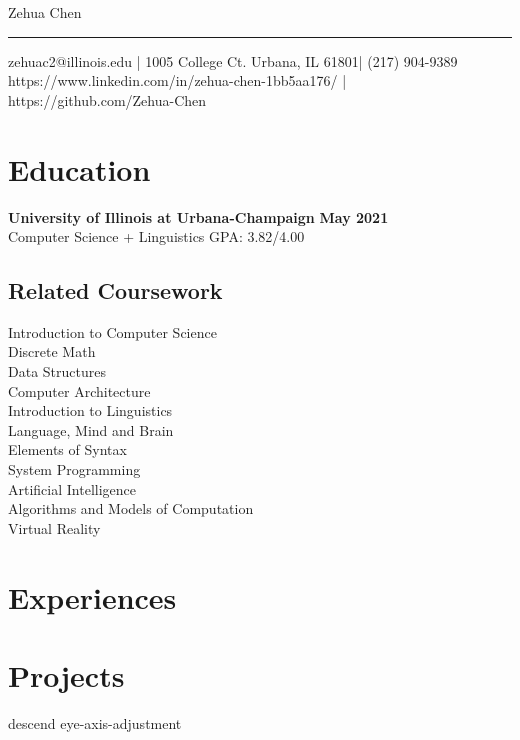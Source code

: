 \documentclass[10pt, letterpaper]{article}
\begin{document}
  \begin{center}
    {\LARGE Zehua Chen} \\
    \rule{\textwidth}{1pt}
    zehuac2@illinois.edu | 1005 College Ct. Urbana, IL 61801| (217) 904-9389 \\
    https://www.linkedin.com/in/zehua-chen-1bb5aa176/ | https://github.com/Zehua-Chen
  \end{center}

  \section{Education}
  {\large\textbf{University of Illinois at Urbana-Champaign}} \hfill {\large\textbf{May 2021}} \\
  {Computer Science + Linguistics} \hfill {GPA: 3.82/4.00}

  \subsection{Related Coursework}

  \vspace{0pt}

  \begin{multicols}{3}
    Introduction to Computer Science \\
    Discrete Math \\
    Data Structures \\
    Computer Architecture \\
    Introduction to Linguistics \\
    Language, Mind and Brain \\
    Elements of Syntax \\
    System Programming \\
    Artificial Intelligence \\
    Algorithms and Models of Computation \\
    Virtual Reality
  \end{multicols}

  \section{Experiences}
  
  
  

  \section{Projects}
  {descend}
  {eye-axis-adjustment}
  
\end{document}
